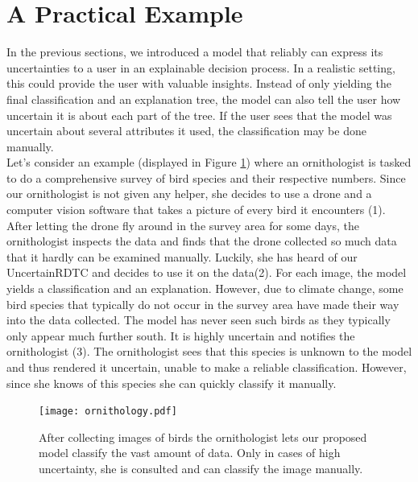 \documentclass[a4paper,cleardoubleempty,BCOR1cm, 11pt]{report}
\begin{document}
\section{A Practical Example}
In the previous sections, we introduced a model that reliably can express its uncertainties to a user in an explainable decision process. In a realistic setting, this could provide the user with valuable insights. Instead of only yielding the final classification and an explanation tree, the model can also tell the user how uncertain it is about each part of the tree. If the user sees that the model was uncertain about several attributes it used, the classification may be done manually.\\
Let's consider an example (displayed in Figure \ref{fig:qual}) where an ornithologist is tasked to do a comprehensive survey of bird species and their respective numbers. Since our ornithologist is not given any helper, she decides to use a drone and a computer vision software that takes a picture of every bird it encounters (1). After letting the drone fly around in the survey area for some days, the ornithologist inspects the data and finds that the drone collected so much data that it hardly can be examined manually. Luckily, she has heard of our UncertainRDTC and decides to use it on the data(2). For each image, the model yields a classification and an explanation. However, due to climate change, some bird species that typically do not occur in the survey area have made their way into the data collected. The model has never seen such birds as they typically only appear much further south. It is highly uncertain and notifies the ornithologist (3). The ornithologist sees that this species is unknown to the model and thus rendered it uncertain, unable to make a reliable classification. However, since she knows of this species she can quickly classify it manually.

\begin{figure}[h]
	\centering
	\texttt{[image: ornithology.pdf]}
	\caption{After collecting images of birds the ornithologist lets our proposed model classify the vast amount of data. Only in cases of high uncertainty, she is consulted and can classify the image manually.}
	\label{fig:qual}
\end{figure}
\end{document}
